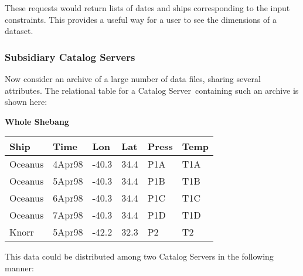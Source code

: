 \documentclass[10pt]{report}
\newcommand{\cs}{Catalog Server}
\begin{document}
These requests would return lists of dates and ships corresponding to
the input constraints.  This provides a useful way for a user to see
the dimensions of a dataset.


\subsubsection{Subsidiary \cs s}

Now consider an archive of a large number of data files, sharing
several attributes.  The relational table for a \cs\ containing such
an archive is shown here:

\begin{center}
\textbf{Whole Shebang} \\
\begin{tabular}{|l|l|l|l|l|l|} \hline
Ship    &Time    &Lon  &Lat &Press &Temp \\ \hline
Oceanus &4Apr98 &-40.3 &34.4&P1A   &T1A  \\
Oceanus &5Apr98 &-40.3 &34.4&P1B   &T1B  \\
Oceanus &6Apr98 &-40.3 &34.4&P1C   &T1C  \\
Oceanus &7Apr98 &-40.3 &34.4&P1D   &T1D  \\
Knorr   &5Apr98 &-42.2 &32.3&P2    &T2   \\ \hline 
\end{tabular}
\end{center}

This data could be distributed among two \cs s in the following
manner:
\end{document}
